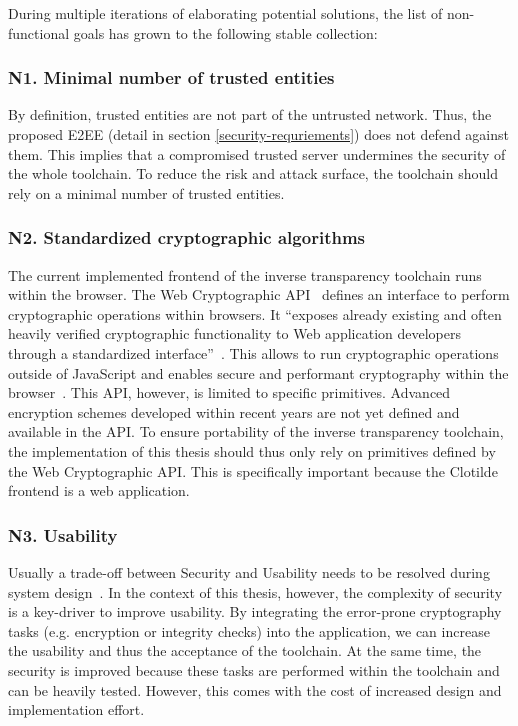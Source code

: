 \documentclass[../main.tex]{subfiles}
\begin{document}
During multiple iterations of elaborating potential solutions, the list of non-functional goals has grown to the following stable collection:


\subsubsection{N1. Minimal number of trusted entities}
By definition, trusted entities are not part of the untrusted network. 
Thus, the proposed E2EE (detail in section \ref{security-requriements}) does not defend against them.
This implies that a compromised trusted server undermines the security of the whole toolchain.
To reduce the risk and attack surface, the toolchain should rely on a minimal number of trusted entities.

\subsubsection{N2. Standardized cryptographic algorithms}
The current implemented frontend of the inverse transparency toolchain runs within the browser. 
The Web Cryptographic API~\cite{WebCryptoApi2017} defines an interface to perform cryptographic operations within browsers. 
It \enquote{exposes already existing and often heavily verified cryptographic functionality to Web application developers through a standardized interface}~\cite[959]{Halpin2014}.
This allows to run cryptographic operations outside of JavaScript and enables secure and performant cryptography within the browser~\cite{Halpin2014}.
This API, however, is limited to specific primitives. 
Advanced encryption schemes developed within recent years are not yet defined and available in the API.
To ensure portability of the inverse transparency toolchain, the implementation of this thesis should thus only rely on primitives defined by the Web Cryptographic API.
This is specifically important because the Clotilde frontend is a web application.

\subsubsection{N3. Usability}
Usually a trade-off between Security and Usability needs to be resolved during system design~.
In the context of this thesis, however, the complexity of security is a key-driver to improve usability. 
By integrating the error-prone cryptography tasks (e.g. encryption or integrity checks) into the application, we can increase the usability and thus the acceptance of the toolchain.
At the same time, the security is improved because these tasks are performed within the toolchain and can be heavily tested.
However, this comes with the cost of increased design and implementation effort.
\end{document}
